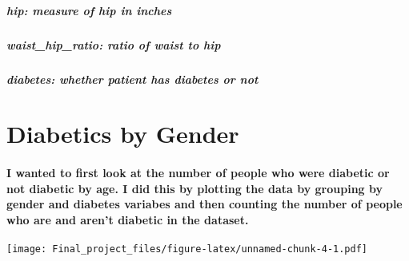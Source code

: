 \documentclass[
]{article}
\begin{document}
\hypertarget{hip-measure-of-hip-in-inches}{%
\subparagraph{\texorpdfstring{\textbf{hip}: measure of hip in
inches}{hip: measure of hip in inches}}\label{hip-measure-of-hip-in-inches}}

\hypertarget{waist_hip_ratio-ratio-of-waist-to-hip}{%
\subparagraph{\texorpdfstring{\textbf{waist\_hip\_ratio}: ratio of waist
to
hip}{waist\_hip\_ratio: ratio of waist to hip}}\label{waist_hip_ratio-ratio-of-waist-to-hip}}

\hypertarget{diabetes-whether-patient-has-diabetes-or-not}{%
\subparagraph{\texorpdfstring{\textbf{diabetes}: whether patient has
diabetes or
not}{diabetes: whether patient has diabetes or not}}\label{diabetes-whether-patient-has-diabetes-or-not}}

\hypertarget{diabetics-by-gender}{%
\section{Diabetics by Gender}\label{diabetics-by-gender}}

\hypertarget{i-wanted-to-first-look-at-the-number-of-people-who-were-diabetic-or-not-diabetic-by-age.-i-did-this-by-plotting-the-data-by-grouping-by-gender-and-diabetes-variabes-and-then-counting-the-number-of-people-who-are-and-arent-diabetic-in-the-dataset.}{%
\paragraph{I wanted to first look at the number of people who were
diabetic or not diabetic by age. I did this by plotting the data by
grouping by gender and diabetes variabes and then counting the number of
people who are and aren't diabetic in the
dataset.}\label{i-wanted-to-first-look-at-the-number-of-people-who-were-diabetic-or-not-diabetic-by-age.-i-did-this-by-plotting-the-data-by-grouping-by-gender-and-diabetes-variabes-and-then-counting-the-number-of-people-who-are-and-arent-diabetic-in-the-dataset.}}

\texttt{[image: Final\_project\_files/figure-latex/unnamed-chunk-4-1.pdf]}
\end{document}
